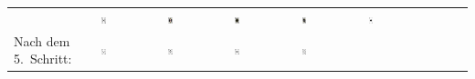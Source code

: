 \begin{tabular}{m{30mm}m{11mm}m{11mm}m{11mm}m{11mm}m{11mm}m{11mm}m{11mm}m{11mm}}
&
\includegraphics[width=0.08\textwidth]{./inf/SEKII/19_Java_Sortierverfahren/Pik9.png}
&
\includegraphics[width=0.08\textwidth]{./inf/SEKII/19_Java_Sortierverfahren/PikBube.png}
&
\includegraphics[width=0.08\textwidth]{./inf/SEKII/19_Java_Sortierverfahren/PikDame.png}
&
\includegraphics[width=0.08\textwidth]{./inf/SEKII/19_Java_Sortierverfahren/PikKoenig.png}
&
\includegraphics[width=0.08\textwidth]{./inf/SEKII/19_Java_Sortierverfahren/PikAs.png}
\\
Nach dem 5.\ Schritt: &
\includegraphics[width=0.08\textwidth]{./inf/SEKII/19_Java_Sortierverfahren/Pik7.png}
&
\includegraphics[width=0.08\textwidth]{./inf/SEKII/19_Java_Sortierverfahren/Pik8.png}
&
\includegraphics[width=0.08\textwidth]{./inf/SEKII/19_Java_Sortierverfahren/Pik9.png}
&
\includegraphics[width=0.08\textwidth]{./inf/SEKII/19_Java_Sortierverfahren/Pik10.png}

\end{tabular}
